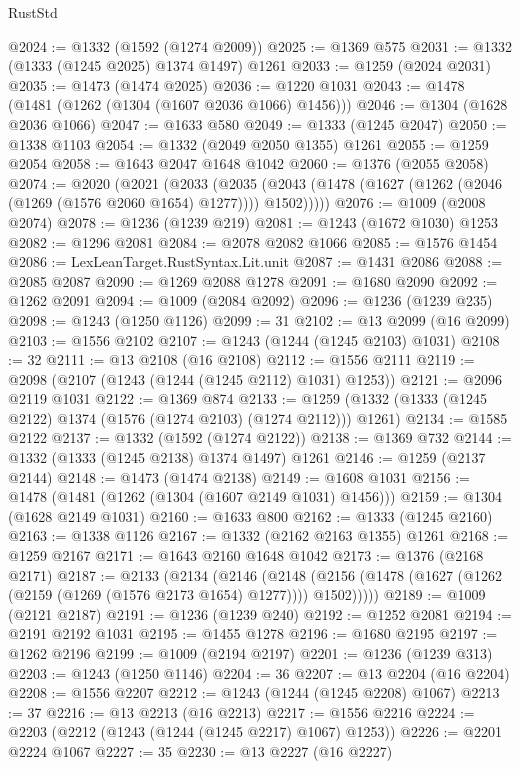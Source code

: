 \begin{lexlean}{RustStd}
\begin{coremodule}
{\begin{coremodule}
{{{{{{{{{{{{{{{{{{{{{{{{{{{{{{{{{{{@2024 := @1332 (@1592 (@1274 @2009))
@2025 := @1369 @575
@2031 := @1332 (@1333 (@1245 @2025) @1374 @1497) @1261
@2033 := @1259 (@2024 @2031)
@2035 := @1473 (@1474 @2025)
@2036 := @1220 @1031
@2043 := @1478 (@1481 (@1262 (@1304 (@1607 @2036 @1066) @1456)))
@2046 := @1304 (@1628 @2036 @1066)
@2047 := @1633 @580
@2049 := @1333 (@1245 @2047)
@2050 := @1338 @1103
@2054 := @1332 (@2049 @2050 @1355) @1261
@2055 := @1259 @2054
@2058 := @1643 @2047 @1648 @1042
@2060 := @1376 (@2055 @2058)
@2074 := @2020
    (@2021
      (@2033
        (@2035 (@2043 (@1478 (@1627 (@1262 (@2046 (@1269 (@1576 @2060 @1654) @1277)))) @1502)))))
@2076 := @1009 (@2008 @2074)
@2078 := @1236 (@1239 @219)
@2081 := @1243 (@1672 @1030) @1253
@2082 := @1296 @2081
@2084 := @2078 @2082 @1066
@2085 := @1576 @1454
@2086 := LexLeanTarget.RustSyntax.Lit.unit
@2087 := @1431 @2086
@2088 := @2085 @2087
@2090 := @1269 @2088 @1278
@2091 := @1680 @2090
@2092 := @1262 @2091
@2094 := @1009 (@2084 @2092)
@2096 := @1236 (@1239 @235)
@2098 := @1243 (@1250 @1126)
@2099 := 31
@2102 := @13 @2099 (@16 @2099)
@2103 := @1556 @2102
@2107 := @1243 (@1244 (@1245 @2103) @1031)
@2108 := 32
@2111 := @13 @2108 (@16 @2108)
@2112 := @1556 @2111
@2119 := @2098 (@2107 (@1243 (@1244 (@1245 @2112) @1031) @1253))
@2121 := @2096 @2119 @1031
@2122 := @1369 @874
@2133 := @1259 (@1332 (@1333 (@1245 @2122) @1374 (@1576 (@1274 @2103) (@1274 @2112))) @1261)
@2134 := @1585 @2122
@2137 := @1332 (@1592 (@1274 @2122))
@2138 := @1369 @732
@2144 := @1332 (@1333 (@1245 @2138) @1374 @1497) @1261
@2146 := @1259 (@2137 @2144)
@2148 := @1473 (@1474 @2138)
@2149 := @1608 @1031
@2156 := @1478 (@1481 (@1262 (@1304 (@1607 @2149 @1031) @1456)))
@2159 := @1304 (@1628 @2149 @1031)
@2160 := @1633 @800
@2162 := @1333 (@1245 @2160)
@2163 := @1338 @1126
@2167 := @1332 (@2162 @2163 @1355) @1261
@2168 := @1259 @2167
@2171 := @1643 @2160 @1648 @1042
@2173 := @1376 (@2168 @2171)
@2187 := @2133
    (@2134
      (@2146
        (@2148 (@2156 (@1478 (@1627 (@1262 (@2159 (@1269 (@1576 @2173 @1654) @1277)))) @1502)))))
@2189 := @1009 (@2121 @2187)
@2191 := @1236 (@1239 @240)
@2192 := @1252 @2081
@2194 := @2191 @2192 @1031
@2195 := @1455 @1278
@2196 := @1680 @2195
@2197 := @1262 @2196
@2199 := @1009 (@2194 @2197)
@2201 := @1236 (@1239 @313)
@2203 := @1243 (@1250 @1146)
@2204 := 36
@2207 := @13 @2204 (@16 @2204)
@2208 := @1556 @2207
@2212 := @1243 (@1244 (@1245 @2208) @1067)
@2213 := 37
@2216 := @13 @2213 (@16 @2213)
@2217 := @1556 @2216
@2224 := @2203 (@2212 (@1243 (@1244 (@1245 @2217) @1067) @1253))
@2226 := @2201 @2224 @1067
@2227 := 35
@2230 := @13 @2227 (@16 @2227)
}}}}}}}}}}}}}}}}}}}}}}}}}}}}}}}}}}}
\end{coremodule}}
\end{coremodule}
\end{lexlean}
